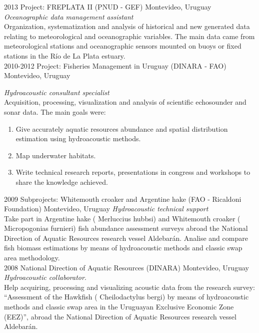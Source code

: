 \documentclass[]{friggeri-cv} %
\begin{document}
\begin{entrylist}
\entry
{2013}
{Project: FREPLATA II (PNUD - GEF)}
{Montevideo, Uruguay}
{\emph{Oceanographic data management assistant} \\ Organization, systematization and analysis of historical and new generated data relating to meteorological and oceanographic variables. The main data came from meteorological stations and oceanographic sensors mounted on buoys or fixed stations in the Río de La Plata estuary. \\}
\entry
{2010-2012}
{Project: Fisheries Management in Uruguay (DINARA - FAO)}
{Montevideo, Uruguay}
{\emph{Hydroacoustic consultant specialist} \\Acquisition, processing, visualization and analysis of scientific echosounder and sonar data. The main goals were:
	\begin{enumerate}
		\item Give accurately aquatic resources abundance and spatial distribution estimation using hydroacoustic methods.
		\item Map underwater habitats.
		\item Write technical research reports, presentations in congress and workshops to share the knowledge achieved.\\   
	\end{enumerate}
	}
\entry
{2009}
{Subprojects: Whitemouth croaker and Argentine hake (FAO - Ricaldoni Foundation)}
{Montevideo, Uruguay}
{\emph{Hydroacoustic technical support}\\Take part in Argentine hake ({\sppfont \color{textcolor} Merluccius hubbsi}) and Whitemouth croaker ({\sppfont \color{textcolor} Micropogonias furnieri}) fish abundance assessment surveys abroad the National Direction of Aquatic Resources research vessel Aldebarán. Analise and compare fish biomass estimations by means of hydroacoustic methods and classic swap area methodology.\\}
\entry
{2008}
{National Direction of Aquatic Resources (DINARA)}
{Montevideo, Uruguay}
{\emph{Hydroacoustic collaborator}. \\ Help acquiring, processing and visualizing acoustic data from the research survey: ``Assessment of the Hawkfish ({\sppfont \color{textcolor} Cheilodactylus bergi}) by means of hydroacoustic methods and classic swap area in the Uruguayan Exclusive Economic Zone (EEZ)'', abroad the National Direction of Aquatic Resources research vessel Aldebarán.}
\end{entrylist}
\end{document}
